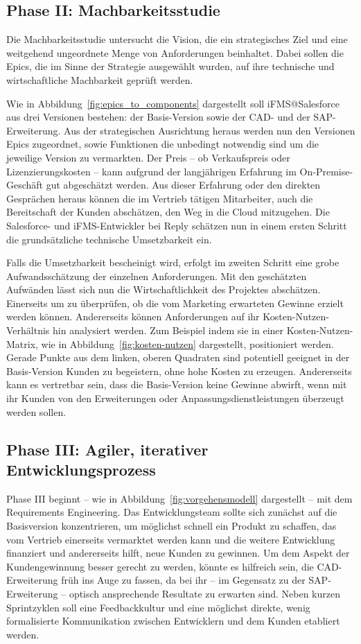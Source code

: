 \subsection{Phase II: Machbarkeitsstudie}
Die Machbarkeitsstudie untersucht die Vision, die ein strategisches Ziel und 
eine weitgehend ungeordnete Menge von Anforderungen beinhaltet. Dabei sollen 
die Epics, die im Sinne der Strategie ausgewählt wurden, auf ihre technische 
und wirtschaftliche Machbarkeit geprüft werden.

Wie in Abbildung~\ref{fig:epics_to_components} dargestellt soll iFMS@Salesforce 
aus drei Versionen bestehen: der Basis-Version sowie der CAD- und der 
SAP-Erweiterung. Aus der strategischen Ausrichtung heraus werden nun den 
Versionen Epics zugeordnet, sowie Funktionen die unbedingt notwendig sind um die 
jeweilige Version zu vermarkten. Der Preis -- ob Verkaufspreis oder 
Lizenzierungskosten -- kann aufgrund der langjährigen Erfahrung im 
On-Premise-Geschäft gut abgeschätzt werden. Aus dieser Erfahrung oder den direkten 
Gesprächen heraus können die im Vertrieb tätigen Mitarbeiter, auch die 
Bereitschaft der Kunden abschätzen, den Weg in die Cloud mitzugehen. Die 
Salesforce- und iFMS-Entwickler bei Reply schätzen nun in einem ersten Schritt 
die grundsätzliche technische Umsetzbarkeit ein.

Falls die Umsetzbarkeit bescheinigt wird, erfolgt im zweiten Schritt eine grobe 
Aufwandsschätzung der einzelnen Anforderungen. Mit den geschätzten Aufwänden 
lässt sich nun die Wirtschaftlichkeit des Projektes abschätzen. Einerseits um zu 
überprüfen, ob die vom Marketing erwarteten Gewinne erzielt werden können. 
Andererseits können Anforderungen auf ihr Kosten-Nutzen-Verhältnis hin 
analysiert werden. Zum Beispiel indem sie in einer Kosten-Nutzen-Matrix, wie in 
Abbildung~\ref{fig:kosten-nutzen} dargestellt, positioniert werden. Gerade Punkte aus dem 
linken, oberen Quadraten sind potentiell geeignet in der Basis-Version Kunden zu 
begeistern, ohne hohe Kosten zu erzeugen.
Andererseits kann es vertretbar sein, dass die Basis-Version keine Gewinne 
abwirft, wenn mit ihr Kunden von den Erweiterungen oder 
Anpassungsdienstleistungen überzeugt werden sollen.

\subsection{Phase III: Agiler, iterativer Entwicklungsprozess}
Phase III beginnt -- wie in Abbildung~\ref{fig:vorgehensmodell} dargestellt -- 
mit dem Requirements Engineering. Das Entwicklungsteam sollte sich zunächst auf 
die Basisversion konzentrieren, um möglichst schnell ein Produkt zu schaffen, 
das vom Vertrieb einerseits vermarktet werden kann und die weitere 
Entwicklung finanziert und andererseits hilft, neue Kunden zu gewinnen. Um dem 
Aspekt der Kundengewinnung besser gerecht zu werden, könnte es hilfreich sein, 
die CAD-Erweiterung früh ins Auge zu fassen, da bei ihr -- im Gegensatz zu der 
SAP-Erweiterung -- optisch ansprechende Resultate zu erwarten sind. 
Neben kurzen Sprintzyklen soll eine Feedbackkultur und eine möglichst direkte, 
wenig formalisierte Kommunikation zwischen Entwicklern und dem 
Kunden etabliert werden.